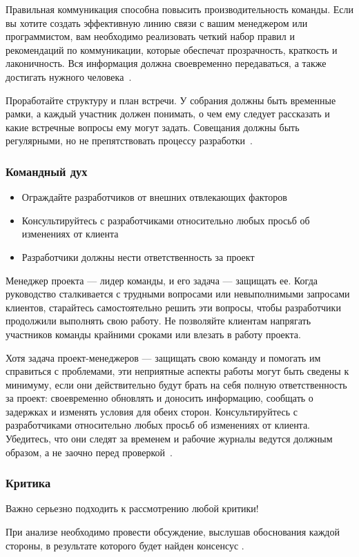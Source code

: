 \documentclass[]{../industrial-development}
\begin{document}
\lecturenotes

Правильная коммуникация способна повысить производительность команды. Если вы хотите создать эффективную линию связи с вашим менеджером или программистом, вам необходимо реализовать четкий набор правил и рекомендаций по коммуникации, которые обеспечат прозрачность, краткость и лаконичность. Вся информация должна своевременно передаваться, а также достигать нужного человека~\cite{Knowledgehut}.

Проработайте структуру и план встречи. У собрания должны быть временные рамки, а каждый участник должен понимать, о чем ему следует рассказать и какие встречные вопросы ему могут задать. Совещания должны быть регулярными, но не препятствовать процессу разработки~\cite{Codementor}.

\begin{frame} \frametitle{Командный дух} 
\begin{itemize}
\item Ограждайте разработчиков от внешних отвлекающих факторов
\item Консультируйтесь с разработчиками относительно любых просьб об изменениях от клиента
\item Разработчики должны нести ответственность за проект
\end{itemize}
\end{frame}

\lecturenotes

Менеджер проекта — лидер команды, и его задача — защищать ее. Когда руководство сталкивается с трудными вопросами или невыполнимыми запросами клиентов, старайтесь самостоятельно решить эти вопросы, чтобы разработчики продолжили выполнять свою работу. Не позволяйте клиентам напрягать участников команды крайними сроками или влезать в работу проекта.

Хотя задача проект-менеджеров — защищать свою команду и помогать им справиться с проблемами, эти неприятные аспекты работы могут быть сведены к минимуму, если они действительно будут брать на себя полную ответственность за проект: своевременно обновлять и доносить информацию, сообщать о задержках и изменять условия для обеих сторон. Консультируйтесь с разработчиками относительно любых просьб об изменениях от клиента. Убедитесь, что они следят за временем и рабочие журналы ведутся должным образом, а не заочно перед проверкой~\cite{Codementor}.

\begin{frame} \frametitle{Критика} 

\begin{block}{}
Важно серьезно подходить к рассмотрению любой критики!
\end{block}
При анализе необходимо провести обсуждение, выслушав обоснования каждой стороны, в результате которого будет найден консенсус .
\end{frame}
\end{document}
